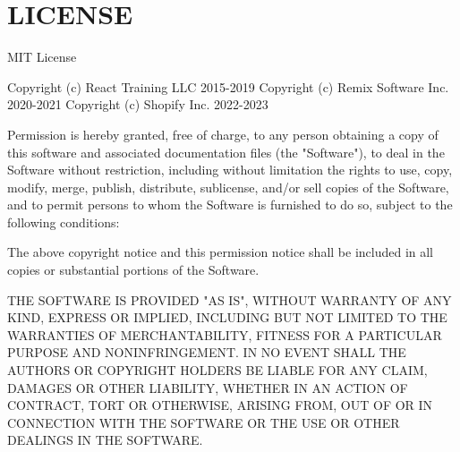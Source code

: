 \chapter{LICENSE }
\hypertarget{md_frontend_2node__modules_2react-router_2LICENSE}{}\label{md_frontend_2node__modules_2react-router_2LICENSE}
MIT License

Copyright (c) React Training LLC 2015-\/2019 Copyright (c) Remix Software Inc. 2020-\/2021 Copyright (c) Shopify Inc. 2022-\/2023

Permission is hereby granted, free of charge, to any person obtaining a copy of this software and associated documentation files (the "{}\+Software"{}), to deal in the Software without restriction, including without limitation the rights to use, copy, modify, merge, publish, distribute, sublicense, and/\+or sell copies of the Software, and to permit persons to whom the Software is furnished to do so, subject to the following conditions:\+

The above copyright notice and this permission notice shall be included in all copies or substantial portions of the Software.

THE SOFTWARE IS PROVIDED "{}\+AS IS"{}, WITHOUT WARRANTY OF ANY KIND, EXPRESS OR IMPLIED, INCLUDING BUT NOT LIMITED TO THE WARRANTIES OF MERCHANTABILITY, FITNESS FOR A PARTICULAR PURPOSE AND NONINFRINGEMENT. IN NO EVENT SHALL THE AUTHORS OR COPYRIGHT HOLDERS BE LIABLE FOR ANY CLAIM, DAMAGES OR OTHER LIABILITY, WHETHER IN AN ACTION OF CONTRACT, TORT OR OTHERWISE, ARISING FROM, OUT OF OR IN CONNECTION WITH THE SOFTWARE OR THE USE OR OTHER DEALINGS IN THE SOFTWARE. 